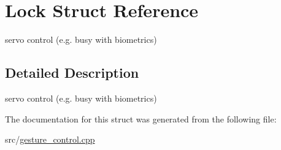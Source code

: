 \hypertarget{struct_lock}{}\section{Lock Struct Reference}
\label{struct_lock}


servo control (e.\+g. busy with biometrics)  




\subsection{Detailed Description}
servo control (e.\+g. busy with biometrics) 

The documentation for this struct was generated from the following file\+:\begin{DoxyCompactItemize}
\item 
src/\hyperlink{gesture__control_8cpp}{gesture\+\_\+control.\+cpp}\end{DoxyCompactItemize}
